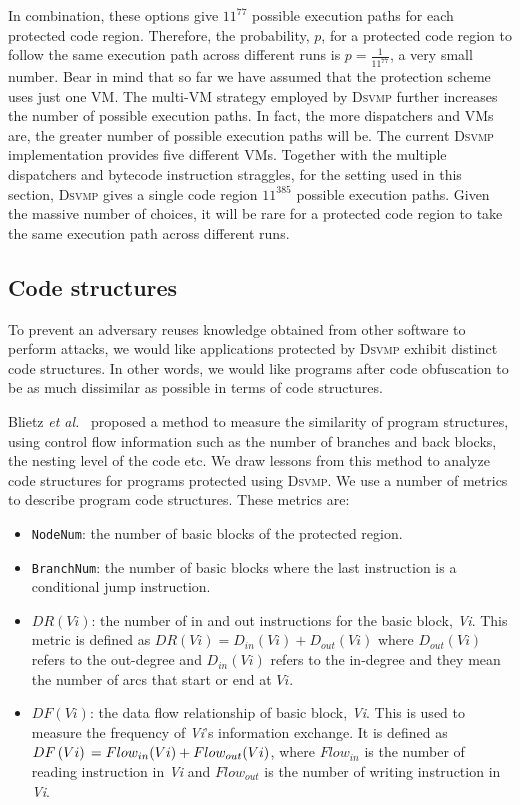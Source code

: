 \documentclass[conference]{IEEEtran}
\newcommand{\DSVMP}{\textsc{Dsvmp}\xspace}
\begin{document}
In combination, these options give $11^{77}$ possible execution paths for each protected code region. 
Therefore, the probability, $p$, for a protected code region to follow the same execution path across 
different runs is $p= \frac{1}{{{{11}^{77}}}}$, a very small number.
Bear in mind that so far we have assumed that the protection scheme uses just one VM. 
The multi-VM strategy employed by \DSVMP further increases the number of possible execution paths. 
In fact, the more dispatchers and VMs are, the greater number of possible execution paths will be.
The current \DSVMP implementation provides five different VMs. Together with the multiple dispatchers 
and bytecode instruction straggles, for the setting used in this section, \DSVMP gives a single code region 
$11^{385}$ possible execution paths. Given the massive number of choices, it will be rare for 
a protected code region to take the same execution path across different runs.



\subsection{Code structures}
To prevent an adversary reuses knowledge obtained from other software to perform attacks, 
we would like applications protected by \DSVMP exhibit distinct code structures. In other words, 
we would like programs after code obfuscation to be as much dissimilar as possible in terms of code structures.

Blietz \emph{et al.}~\cite{18blietz2006software} proposed a method to measure the similarity of program structures, using control flow
information such as the number of branches and back blocks, the nesting level of the code etc. We draw lessons from this method to analyze code structures for programs protected using \DSVMP. We use a number of metrics to describe program code structures. These metrics are:

\begin{itemize}
\item \texttt{NodeNum}: the number of basic blocks of the protected region.
\item \texttt{BranchNum}: the number of basic blocks where the last instruction is a conditional jump instruction.
\item $DR(Vi)$: the number of in and out instructions for the basic block, \emph{Vi}. This metric is defined as $DR(Vi) = {D_{in}}(Vi) + {D_{out}}(Vi)$ where ${D_{out}}\left( {Vi} \right)$ refers to the out-degree and ${D_{in}}\left( {Vi} \right)$ refers to the in-degree and they mean the number of arcs that start or end at $Vi$.
\item $DF(Vi)$: the data flow relationship of basic block, \emph{Vi}. This is used to measure the frequency of \emph{Vi}'s information exchange. It is defined as $DF\left( {Vi} \right){\rm{ }} = {\rm{ }}Flo{w_{in}}(Vi) + Flo{w_{out}}(Vi)$, where $Flo{w_{in}}$ is the number of reading instruction in \emph{Vi} and $Flo{w_{out}}$ is the number of writing instruction in \emph{Vi}.
\end{itemize}
\end{document}
